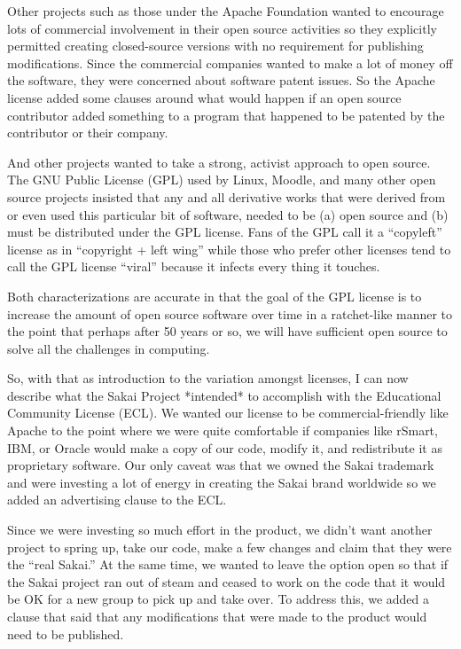 \documentclass[12pt]{book}
\begin{document}
Other projects such as those under the Apache
Foundation wanted to encourage lots of commercial
involvement in their open source activities so they
explicitly permitted creating closed-source versions
with no requirement for publishing modifications.
Since the commercial companies wanted to make
a lot of money off the software, they were
concerned about software patent issues. So the Apache
license added some clauses around what would
happen if an open source contributor added something
to a program that happened to be patented by the
contributor or their company.

And other projects wanted to take a strong, activist
approach to open source.   The GNU Public License (GPL)
used by Linux, Moodle, and many other
open source projects insisted that any and all
derivative works that were derived from or even used
this particular bit of software, needed to be (a)
open source and (b) must be distributed under the
GPL license.  Fans of the GPL call it a ``copyleft''
license as in ``copyright + left wing'' while
those who prefer other licenses tend to call the
GPL license ``viral'' because it infects every
thing it touches.

Both characterizations are accurate in that the
goal of the GPL license is to increase the amount
of open source software over time in a ratchet-like
manner to the point that perhaps after 50 years or
so, we will have sufficient open source to solve
all the challenges in computing.

So, with that as introduction to the variation
amongst licenses, I can now describe
what the Sakai Project *intended* to accomplish with
the Educational Community License (ECL).  We wanted our
license to be commercial-friendly like Apache
to the point where we were quite comfortable if
companies like rSmart, IBM, or Oracle would make
a copy of our code, modify it, and redistribute
it as proprietary software.  Our only caveat was
that we owned the Sakai trademark and were
investing a lot of energy
in creating the Sakai brand worldwide so we added
an advertising clause to the ECL.

Since we were investing so much effort in
the product, we didn't want another project to
spring up, take our code, make a few changes and claim
that they were the ``real Sakai.''  At the same
time, we wanted to leave the option open so
that if the Sakai project ran out of steam and ceased
to work on the code that it would be OK for a new
group to pick up and take over.  To address this, we added
a clause that said that any modifications that
were made to the product would need to be
published.
\end{document}
